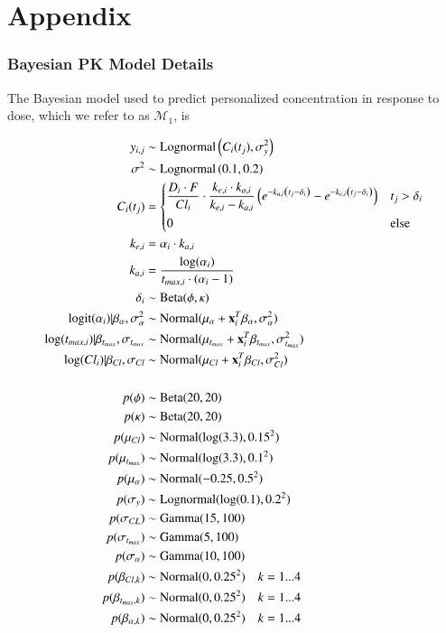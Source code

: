 \section{Appendix}\label{ap:appendix}

\subsubsection{Bayesian PK Model Details}

The Bayesian model used to predict personalized concentration in response to dose, which we refer to as $ \mathcal{M}_1 $, is 

\begin{align}\label{model_M1}
	y_{i,j} &\sim \operatorname{Lognormal}  \left(  C_i(t_j)  , \sigma^2_y \right)  \\
	\sigma^2 &\sim \operatorname{Lognormal} \left( 0.1, 0.2 \right)\\	
	C_i(t_j) &= \begin{dcases}
	\frac{D_{i} \cdot F}{C l_{i}} \cdot \frac{k_{e, i} \cdot k_{a, i}}{k_{e, i}-k_{a, i}}\left(e^{-k_{a, i}\left(t_{j}-\delta_{i}\right)}-e^{-k_{e, i}\left(t_{j}-\delta_{i}\right)}\right) & t_j>\delta_i \\
	0 & \mbox{else}
	\end{dcases}\\
	k_{e,i} &= \alpha_i \cdot k_{a,i}\\
	k_{a,i} &= \dfrac{\log(\alpha_i)}{t_{max, i}\cdot(\alpha_i-1)}\\
	\delta_i &\sim \operatorname{Beta}(\phi, \kappa) \\
	\operatorname{logit}(\alpha_i) \vert \beta_\alpha, \sigma^2_\alpha &\sim \operatorname{Normal}(\mu_\alpha + \mathbf{x}_i^T \beta_\alpha, \sigma^2_\alpha)\\
	\log(t_{max, i}) \vert \beta_{t_{max}}, \sigma_{t_{max}} &\sim \operatorname{Normal}(\mu_{t_{max}} + \mathbf{x}^T_i \beta_{t_{max}}, \sigma^2_{t_{max}}) \\
	\log(Cl_i) \vert \beta_{Cl}, \sigma_{Cl} &\sim \operatorname{Normal}(\mu_{Cl} + \mathbf{x}^T_i \beta_{Cl}, \sigma^2_{Cl}) \\ \nonumber \\
	p(\phi) &\sim \operatorname{Beta}(20, 20)\\
	p(\kappa) &\sim \operatorname{Beta}(20, 20)\\
	p(\mu_{Cl}) &\sim \operatorname{Normal}(\log(3.3), 0.15^2)\\
	p(\mu_{t_{max}}) &\sim \operatorname{Normal}(\log(3.3), 0.1^2)\\
	p(\mu_{\alpha}) &\sim \operatorname{Normal}(-0.25, 0.5^2)\\
	p(\sigma_y) &\sim \operatorname{Lognormal}(\log(0.1), 0.2^2)\\
	p(\sigma_{CL}) &\sim \operatorname{Gamma}(15, 100)\\
	p(\sigma_{t_{max}}) &\sim \operatorname{Gamma}(5, 100)\\
	p(\sigma_{\alpha}) &\sim \operatorname{Gamma}(10, 100)\\
	p(\beta_{Cl, k}) &\sim \operatorname{Normal}(0, 0.25^2) \quad k = 1 ...	 4\\
	p(\beta_{t_{max}, k}) &\sim \operatorname{Normal}(0, 0.25^2) \quad k = 1 ... 4\\	
	p(\beta_{\alpha, k}) &\sim \operatorname{Normal}(0, 0.25^2) \quad k = 1 ... 4
\end{align}

